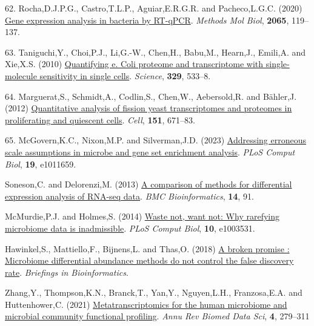\documentclass[
]{article}
\newlength{\cslhangindent}
\newenvironment{CSLReferences}[2] %
 {\begin{list}{}{%
  \setlength{\itemindent}{0pt}
  \setlength{\leftmargin}{0pt}
  \setlength{\parsep}{0pt}
  \ifodd #1
   \setlength{\leftmargin}{\cslhangindent}
   \setlength{\itemindent}{-1\cslhangindent}
  \fi
  \setlength{\itemsep}{#2\baselineskip}}}
 {\end{list}}
\providecommand{\DIFadd}[1]{{\protect\color{blue}\uwave{#1}}} %
\providecommand{\DIFaddbegin}{} %
\providecommand{\DIFaddend}{} %
\newcommand{\DIFaddincludegraphics}[2][]{{\color{blue}\fbox{\DIFOincludegraphics[#1]{#2}}}} %
\DeclareRobustCommand{\DIFaddbegin}{\DIFOaddbegin \let\includegraphics\DIFaddincludegraphics} %
\DeclareRobustCommand{\DIFaddend}{\DIFOaddend \let\includegraphics\DIFOincludegraphics} %
\begin{document}
\begin{CSLReferences}{1}{1}
62. Rocha,D.J.P.G., Castro,T.L.P., Aguiar,E.R.G.R. and Pacheco,L.G.C.
(2020) \href{https://doi.org/10.1007/978-1-4939-9833-3_10}{Gene
expression analysis in bacteria by RT-qPCR}. \emph{Methods Mol Biol},
\textbf{2065}, 119--137.

63. Taniguchi,Y., Choi,P.J., Li,G.-W., Chen,H., Babu,M., Hearn,J.,
Emili,A. and Xie,X.S. (2010)
\href{https://doi.org/10.1126/science.1188308}{Quantifying e. Coli
proteome and transcriptome with single-molecule sensitivity in single
cells}. \emph{Science}, \textbf{329}, 533--8.

64. Marguerat,S., Schmidt,A., Codlin,S., Chen,W., Aebersold,R. and
Bähler,J. (2012)
\href{https://doi.org/10.1016/j.cell.2012.09.019}{Quantitative analysis
of fission yeast transcriptomes and proteomes in proliferating and
quiescent cells}. \emph{Cell}, \textbf{151}, 671--83.

65. McGovern,K.C., Nixon,M.P. and Silverman,J.D. (2023)
\href{https://doi.org/10.1371/journal.pcbi.1011659}{Addressing erroneous
scale assumptions in microbe and gene set enrichment analysis}.
\emph{PLoS Comput Biol}, \textbf{19}, e1011659.

 \DIFaddbegin \DIFadd{66. }\DIFaddend Soneson,C. and Delorenzi,M. (2013)
\href{https://doi.org/10.1186/1471-2105-14-91}{A comparison of methods
for differential expression analysis of {RNA-seq} data}. \emph{BMC
Bioinformatics}, \textbf{14}, 91.

 \DIFaddbegin \DIFadd{67. }\DIFaddend McMurdie,P.J. and Holmes,S. (2014)
\href{https://doi.org/10.1371/journal.pcbi.1003531}{Waste not, want not:
Why rarefying microbiome data is inadmissible}. \emph{PLoS Comput Biol},
\textbf{10}, e1003531.

 \DIFaddbegin \DIFadd{68. }\DIFaddend Hawinkel,S., Mattiello,F., Bijnens,L. and Thas,O. (2018)
\href{http://dx.doi.org/10.1093/bib/bbx104}{A broken promise :
Microbiome differential abundance methods do not control the false
discovery rate}. \emph{Briefings in Bioinformatics}.

 \DIFaddbegin \DIFadd{69. }\DIFaddend Zhang,Y., Thompson,K.N., Branck,T., Yan,Y., Nguyen,L.H.,
Franzosa,E.A. and Huttenhower,C. (2021)
\href{https://doi.org/10.1146/annurev-biodatasci-031121-103035}{Metatranscriptomics
for the human microbiome and microbial community functional profiling}.
\emph{Annu Rev Biomed Data Sci}, \textbf{4}, 279--311\DIFaddbegin \DIFadd{.
}


\end{CSLReferences}
\end{document}
